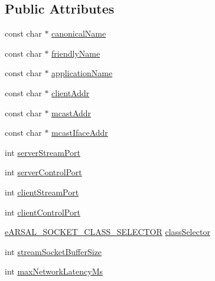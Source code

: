 \subsection*{Public Attributes}
\begin{DoxyCompactItemize}
\item 
const char $\ast$ \hyperlink{struct_a_r_s_t_r_e_a_m2___stream_receiver___resender_config__t_a5b7a7bb24d3071a8e5d864ed1ca9439e}{canonical\+Name}
\item 
const char $\ast$ \hyperlink{struct_a_r_s_t_r_e_a_m2___stream_receiver___resender_config__t_a66404bead227a246ca1bb2b02fd5e514}{friendly\+Name}
\item 
const char $\ast$ \hyperlink{struct_a_r_s_t_r_e_a_m2___stream_receiver___resender_config__t_a67c07579f7fbef6517b9ea2c8e832697}{application\+Name}
\item 
const char $\ast$ \hyperlink{struct_a_r_s_t_r_e_a_m2___stream_receiver___resender_config__t_ad05eee0b403f19c4a6b5675e40544dac}{client\+Addr}
\item 
const char $\ast$ \hyperlink{struct_a_r_s_t_r_e_a_m2___stream_receiver___resender_config__t_ab4b56c7ba9febba25d72f44806f93e3f}{mcast\+Addr}
\item 
const char $\ast$ \hyperlink{struct_a_r_s_t_r_e_a_m2___stream_receiver___resender_config__t_a6a313a75822a372268f1282f27caa6cb}{mcast\+Iface\+Addr}
\item 
int \hyperlink{struct_a_r_s_t_r_e_a_m2___stream_receiver___resender_config__t_a5ea3db7bc9baf84efdf4407f1704ee28}{server\+Stream\+Port}
\item 
int \hyperlink{struct_a_r_s_t_r_e_a_m2___stream_receiver___resender_config__t_ae7b4ed968186a5febe2f1da1e521e374}{server\+Control\+Port}
\item 
int \hyperlink{struct_a_r_s_t_r_e_a_m2___stream_receiver___resender_config__t_a0efdb54b1738ba4a8d979db80557d07c}{client\+Stream\+Port}
\item 
int \hyperlink{struct_a_r_s_t_r_e_a_m2___stream_receiver___resender_config__t_af3abe5498aadc890bdba24cb7c58dad1}{client\+Control\+Port}
\item 
\hyperlink{_a_r_s_a_l___socket_8h_a384a22e08e042073bccebf450786749b}{e\+A\+R\+S\+A\+L\+\_\+\+S\+O\+C\+K\+E\+T\+\_\+\+C\+L\+A\+S\+S\+\_\+\+S\+E\+L\+E\+C\+T\+OR} \hyperlink{struct_a_r_s_t_r_e_a_m2___stream_receiver___resender_config__t_a60294b77bc0c01a25d8e493345cbeb59}{class\+Selector}
\item 
int \hyperlink{struct_a_r_s_t_r_e_a_m2___stream_receiver___resender_config__t_af3f3cb6602a1e436b254c157b54a8a10}{stream\+Socket\+Buffer\+Size}
\item 
int \hyperlink{struct_a_r_s_t_r_e_a_m2___stream_receiver___resender_config__t_a524d974cfc0a175a8740b39352e9448c}{max\+Network\+Latency\+Ms}
\end{DoxyCompactItemize}



